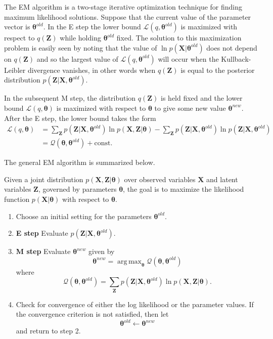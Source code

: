 \documentclass[a4paper]{book}
\newcommand{\up}{\mathrm}
\renewcommand{\bf}{\mathbf}
\renewcommand{\cal}{\mathcal}
\newcommand{\bs}{\boldsymbol}
\DeclareMathOperator*{\argmax}{arg\,max}
\begin{document}
The EM algorithm is a two-stage iterative optimization technique for finding maximum likelihood solutions. Suppose that the current value of the parameter vector is $\bs{\theta}^{old}$. In the E step the lower bound $\cal{L}(q,\bs{\theta}^{old})$ is maximized with respect to $q(\bf{Z})$ while holding $\bs{\theta}^{old}$ fixed. The solution to this maximization problem is easily seen by noting that the value of $\ln p(\bf{X}|\bs{\theta}^{old})$ does not depend on $q(\bf{Z})$ and so the largest value of $\cal{L}(q,\bs{\theta}^{old})$ will occur when the Kullback-Leibler divergence vanishes, in other words when $q(\bf{Z})$ is equal to the posterior distribution $p(\bf{Z|X},\bs{\theta}^{old})$.

In the subsequent M step, the distribution $q(\bf{Z})$ is held fixed and the lower bound $\cal{L}(q,\bs{\theta})$ is maximized with respect to $\bs{\theta}$ to give some new value $\bs{\theta}^{new}$. After the E step, the lower bound takes the form
\begin{align}
	\cal{L}(q,\bs{\theta})  &= \sum_{\bf{Z}} p(\bf{Z|X},\bs{\theta}^{old})\ln p(\bf{X,Z|}\bs{\theta}) - \sum_{\bf{Z}} p(\bf{Z|X,}\bs{\theta}^{old}) \ln p(\bf{Z|X},\bs{\theta}^{old})\\
	&=\cal{Q}(\bs{\theta,\theta}^{old}) + \up{const}.
\end{align}

The general EM algorithm is summarized below.

Given a joint distribution $p(\bf{X,Z|}\bs{\theta})$ over observed variables $\bf{X}$ and latent variables $\bf{Z}$, governed by parameters $\bf{\theta}$, the goal is to maximize the likelihood function $p(\bf{X}|\bs{\theta})$ with respect to $\bs{\theta}$.
\begin{enumerate}
	\item Choose an initial setting for the parameters $\bs{\theta}^{old}$.
	\item \textbf{E step} Evaluate $p(\bf{Z|X},\bs{\theta}^{old})$.
	\item \textbf{M step} Evaluate $\bs{\theta}^{new}$ given by
	\begin{equation*}
		\bs{\theta}^{new} = \argmax_{\bs{\theta}} \cal{Q}(\bs{\theta,\theta}^{old})	
	\end{equation*}
	where 
	\begin{equation*}
		\cal{Q}(\bs{\theta,\theta}^{old})=\sum_{\bf{Z}} p(\bf{Z|X,}\bs{\theta}^{old})\ln p(\bf{X,Z|}\bs{\theta}).
	\end{equation*}
	\item Check for convergence of either the log likelihood or the parameter values. If the convergence criterion is not satisfied, then let
	\begin{equation*}
		\bs{\theta}^{old} \leftarrow \bs{\theta}^{new}
	\end{equation*}
	and return to step 2.
\end{enumerate}
\end{document}
